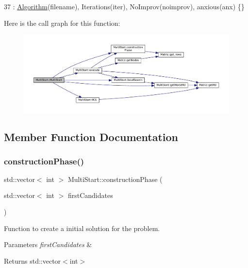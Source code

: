 \begin{DoxyCode}
37 : \hyperlink{classAlgorithm_a89df1d2c6751f70733f38daa0ee2a13b}{Algorithm}(filename), Iterations(iter), NoImprov(noimprov), anxious(anx) \{\}
\end{DoxyCode}
Here is the call graph for this function\+:
\nopagebreak
\begin{figure}[H]
\begin{center}
\leavevmode
\includegraphics[width=350pt]{classMultiStart_ae16c330042c4b1dfb87dae8312d07a65_cgraph}
\end{center}
\end{figure}


\subsection{Member Function Documentation}
\mbox{\label{classMultiStart_a29c5796648ede3e6c7fe8ca8043f8187}} 
\subsubsection{\texorpdfstring{construction\+Phase()}{constructionPhase()}}
{\footnotesize\ttfamily std\+::vector$<$ int $>$ Multi\+Start\+::construction\+Phase (\begin{DoxyParamCaption}\item[{std\+::vector$<$ int $>$}]{first\+Candidates }\end{DoxyParamCaption})}



Function to create a initial solution for the problem. 


\begin{DoxyParams}{Parameters}
{\em first\+Candidates} & \\
\hline
\end{DoxyParams}
\begin{DoxyReturn}{Returns}
std\+::vector$<$int$>$ 
\end{DoxyReturn}


